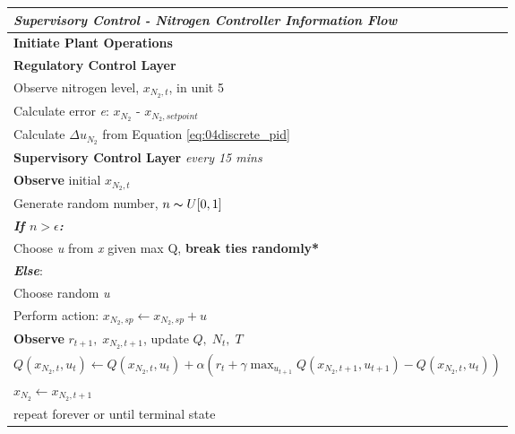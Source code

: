 \begin{table}[H]
	\begin{tabular}{p{15.5cm}}
	\hline
	\emph{Supervisory Control - Nitrogen Controller Information Flow} \\ \hline
	\textbf{Initiate Plant Operations} \\
	\hspace{0.75cm} \textbf{Regulatory Control Layer} \\
	\hspace{0.75cm} Observe nitrogen level, $x_{N_2, t}$, in unit 5\\
	\hspace{0.75cm} Calculate error \emph{e}: $x_{N_2}$ - $x_{N_2, setpoint}$ \\
	\hspace{0.75cm} Calculate $\Delta u_{N_2}$ from Equation \ref{eq:04discrete_pid} \\
	\hspace{1.5cm} \textbf{Supervisory Control Layer} \emph{every 15 mins} \\
	\hspace{2.25cm} \textbf{Observe} initial $x_{N_2, t}$ \\
	\hspace{2.25cm} Generate random number, $n \thicksim U[0, 1]$ \\
    \hspace{2.25cm} \textbf{\emph{If $n > \epsilon$:}} \\ 
    \hspace{3cm} Choose \emph{u} from \emph{x} given max Q, \textbf{break ties randomly*} \\
    \hspace{2.25cm} \textbf{\emph{Else}}: \\
    \hspace{3cm} Choose random \emph{u} \\
	\hspace{2.25cm} Perform action: $x_{N_2, sp} \leftarrow x_{N_2, sp} + u$ \\
	\hspace{2.25cm} \textbf{Observe} $r_{t+1}, \; x_{N_2, t+1}$, update $Q, \; N_t, \; T$ \\
    \hspace{2.25cm} $Q(x_{N_2, t}, u_t) \leftarrow Q(x_{N_2, t}, u_t) + \alpha(r_t + \gamma \max_{u_{t+1}} Q(x_{N_2, t+1}, u_{t+1}) - Q(x_{N_2, t}, u_t))$ \\
	\hspace{2.25cm} $x_{N_2} \leftarrow x_{N_2, t+1}$ \\
	\hspace{0.75cm} repeat forever or until terminal state \\
	\hline
	\end{tabular}
\end{table}


